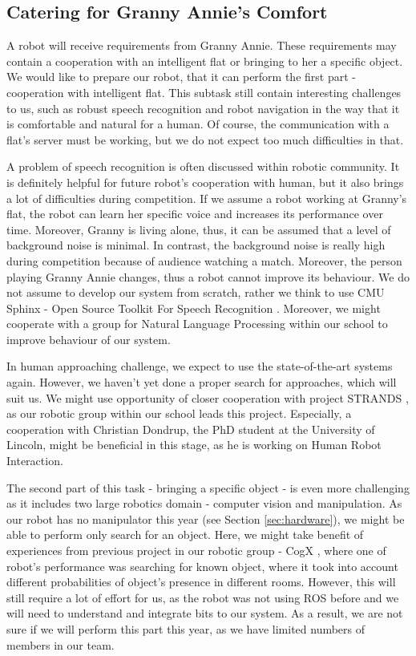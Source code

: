 \documentclass[conference]{IEEEtran}
\begin{document}
\subsection{Catering for Granny Annie’s Comfort}

A robot will receive requirements from Granny Annie. These requirements may contain a cooperation with an intelligent flat or bringing to her a specific object. We would like to prepare our robot, that it can perform the first part - cooperation with intelligent flat. This subtask still contain interesting challenges to us, such as robust speech recognition and robot navigation in the way that it is comfortable and natural for a human. Of course, the communication with a flat's server must be working, but we do not expect too much difficulties in that. 

A problem of speech recognition is often discussed within robotic community. It is definitely helpful for future robot's cooperation with human, but it also brings a lot of difficulties during competition. If we assume a robot working at Granny's flat, the robot can learn her specific voice and increases its performance over time. Moreover, Granny is living alone, thus, it can be assumed that a level of background noise is minimal. In contrast, the background noise is really high during competition because of audience watching a match. Moreover, the person playing Granny Annie changes, thus a robot cannot improve its behaviour. We do not assume to develop our system from scratch, rather we think to use CMU Sphinx - Open Source Toolkit For Speech Recognition \cite{cmu}. Moreover, we might cooperate with a group for Natural Language Processing within our school to improve behaviour of our system.

In human approaching challenge, we expect to use the state-of-the-art systems again. However, we haven't yet done a proper search for approaches, which will suit us. We might use opportunity of closer cooperation with project STRANDS \cite{strands}, as our robotic group within our school leads this project. Especially, a cooperation with Christian Dondrup, the PhD student at the University of Lincoln, might be beneficial in this stage, as he is working on Human Robot Interaction.

The second part of this task - bringing a specific object - is even more challenging as it includes two large robotics domain - computer vision and manipulation. As our robot has no manipulator this year (see Section \ref{sec:hardware}), we might be able to perform only search for an object. Here, we might take benefit of experiences from previous project in our robotic group - CogX \cite{cogx}, where one of robot's performance was searching for known object, where it took into account different probabilities of object's presence in different rooms. However, this will still require a lot of effort for us, as the robot was not using ROS before and we will need to understand and integrate bits to our system. As a result, we are not sure if we will perform this part this year, as we have limited numbers of members in our team.
\end{document}
